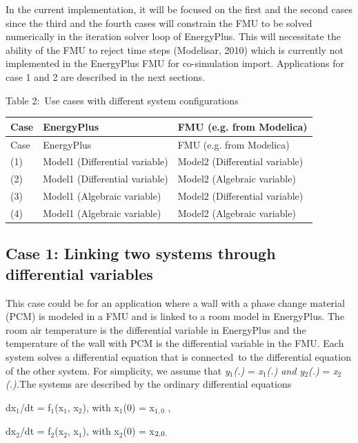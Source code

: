 In the current implementation, it will be focused on the first and the second cases since the third and the fourth cases will constrain the FMU to be solved numerically in the iteration solver loop of EnergyPlus. This will necessitate the ability of the FMU to reject time steps (Modelisar, 2010) which is currently not implemented in the EnergyPlus FMU for co-simulation import. Applications for case 1 and 2 are described in the next sections.

Table 2:~Use cases with different system configurations

\begin{longtable}[c]{@{}lll@{}}
\toprule 
Case & EnergyPlus & FMU (e.g. from Modelica) \tabularnewline
\midrule
\endfirsthead

\toprule 
Case & EnergyPlus & FMU (e.g. from Modelica) \tabularnewline
\midrule
\endhead

(1) & Model1 (Differential variable) & Model2 (Differential variable) \tabularnewline
(2) & Model1 (Differential variable) & Model2 (Algebraic variable) \tabularnewline
(3) & Model1 (Algebraic variable) & Model2 (Differential variable) \tabularnewline
(4) & Model1 (Algebraic variable) & Model2 (Algebraic variable) \tabularnewline
\bottomrule
\end{longtable}

\subsection{Case 1: Linking two systems through differential variables}\label{case-1-linking-two-systems-through-differential-variables}

This case could be for an application where a wall with a phase change material (PCM) is modeled in a FMU and is linked to a room model in EnergyPlus. The room air temperature is the differential variable in EnergyPlus and the temperature of the wall with PCM is the differential variable in the FMU. Each system solves a differential equation that is connected~to the differential equation of the other system. For simplicity, we assume that \emph{y\(_{1}\)(.)} = \emph{x\(_{1}\)(.) and y\(_{2}\)(.)} = \emph{x\(_{2}\)(.).}The systems are described by the ordinary differential equations

dx\(_{1}\)/dt = f\(_{1}\)(x\(_{1}\), x\(_{2}\)), with x\(_{1}\)(0) = x\(_{1,0}\) ,

dx\(_{2}\)/dt = f\(_{2}\)(x\(_{2}\), x\(_{1}\)), with x\(_{2}\)(0) = x\(_{2,0\\ .}\)

